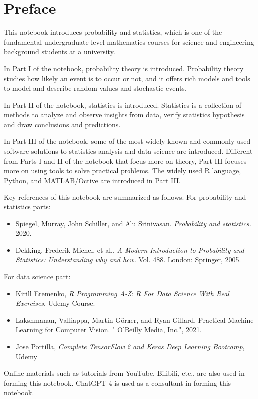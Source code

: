 \chapter*{Preface}

This notebook introduces probability and statistics, which is one of the fundamental undergraduate-level mathematics courses for science and engineering background students at a university.

In Part I of the notebook, probability theory is introduced. Probability theory studies how likely an event is to occur or not, and it offers rich models and tools to model and describe random values and stochastic events.

In Part II of the notebook, statistics is introduced. Statistics is a collection of methods to analyze and observe insights from data, verify statistics hypothesis and draw conclusions and predictions.

In Part III of the notebook, some of the most widely known and commonly used software solutions to statistics analysis and data science are introduced. Different from Parts I and II of the notebook that focus more on theory, Part III focuses more on using tools to solve practical problems. The widely used R language, Python, and MATLAB/Octive are introduced in Part III.

Key references of this notebook are summarized as follows. For probability and statistics parts:
\begin{itemize}
  \item Spiegel, Murray, John Schiller, and Alu Srinivasan. \textit{Probability and statistics.} 2020.
  \item Dekking, Frederik Michel, et al., \textit{A Modern Introduction to Probability and Statistics: Understanding why and how.} Vol. 488. London: Springer, 2005.
\end{itemize}
For data science part:
\begin{itemize}
  \item Kirill Eremenko, \textit{R Programming A-Z: R For Data Science With Real Exercises}, Udemy Course.
  \item Lakshmanan, Valliappa, Martin Görner, and Ryan Gillard. Practical Machine Learning for Computer Vision. " O'Reilly Media, Inc.", 2021.
  \item Jose Portilla, \textit{Complete TensorFlow 2 and Keras Deep Learning Bootcamp}, Udemy
\end{itemize} 

Online materials such as tutorials from YouTube, Bilibili, etc., are also used in forming this notebook. ChatGPT-4 is used as a consultant in forming this notebook. 